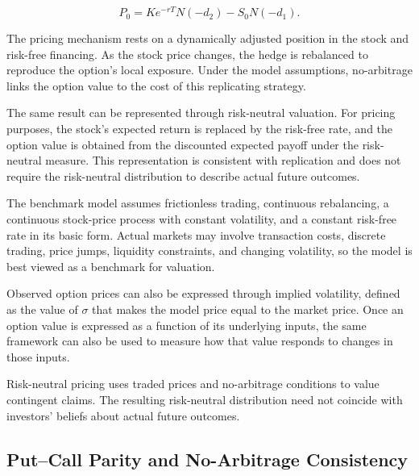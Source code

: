 \begin{equation}
P_0
=Ke^{-rT}N(-d_2)-S_0N(-d_1).
\label{eq:ch18-bsm-put}
\end{equation}

The pricing mechanism rests on a dynamically adjusted position in the stock and risk-free financing. As the stock price changes, the hedge is rebalanced to reproduce the option's local exposure. Under the model assumptions, no-arbitrage links the option value to the cost of this replicating strategy.

The same result can be represented through risk-neutral valuation. For pricing purposes, the stock's expected return is replaced by the risk-free rate, and the option value is obtained from the discounted expected payoff under the risk-neutral measure. This representation is consistent with replication and does not require the risk-neutral distribution to describe actual future outcomes.

The benchmark model assumes frictionless trading, continuous rebalancing, a continuous stock-price process with constant volatility, and a constant risk-free rate in its basic form. Actual markets may involve transaction costs, discrete trading, price jumps, liquidity constraints, and changing volatility, so the model is best viewed as a benchmark for valuation.

Observed option prices can also be expressed through implied volatility, defined as the value of \(\sigma\) that makes the model price equal to the market price. Once an option value is expressed as a function of its underlying inputs, the same framework can also be used to measure how that value responds to changes in those inputs.


\begin{tcolorbox}[
enhanced,
breakable,
colback=white,
colframe=FinanceBlue,
boxrule=0.7pt,
sharp corners,
borderline west={2.2pt}{0pt}{FinanceBlue},
title=\textbf{Financial Perspective: A Pricing Model Is Not a Forecast},
coltitle=white,
colbacktitle=FinanceBlue,
fonttitle=\bfseries,
before skip=1.2em,
after skip=1.2em
]

Risk-neutral pricing uses traded prices and no-arbitrage conditions to value contingent claims. The resulting risk-neutral distribution need not coincide with investors' beliefs about actual future outcomes.

\end{tcolorbox}

\subsection{Put--Call Parity and No-Arbitrage Consistency}

